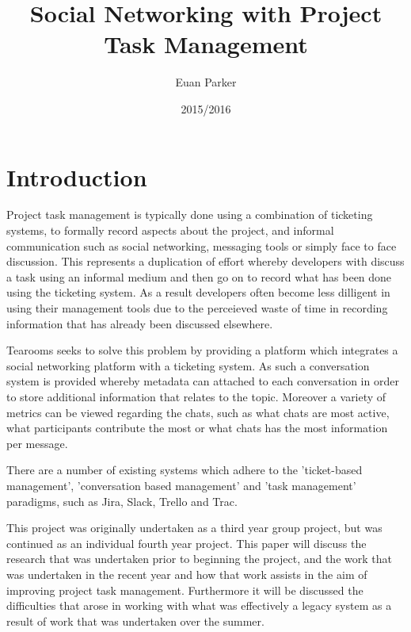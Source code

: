 \documentclass{l4proj}
\begin{document}
\title{Social Networking with Project Task Management}
\author{Euan Parker}
\date{2015/2016}
\maketitle

\begin{abstract}

\end{abstract}

\educationalconsent
%
%
\tableofcontents

\chapter{Introduction}


Project task management is typically done using a combination of ticketing systems, to formally record aspects about the project, and informal communication such as social networking, messaging tools or simply face to face discussion. This represents a duplication of effort whereby developers with discuss a task using an informal medium and then go on to record what has been done using the ticketing system.  As a result developers often become less dilligent in using their management tools due to the perceieved waste of time in recording information that has already been discussed elsewhere. 

Tearooms seeks to solve this problem by providing a platform which integrates a social networking platform with a ticketing system.  As such a conversation system is provided whereby metadata can attached to each conversation in order to store additional information that relates to the topic.  Moreover a variety of metrics can be viewed regarding the chats, such as what chats are most active, what participants contribute the most or what chats has the most information per message.

There are a number of existing systems which adhere to the 'ticket-based management', 'conversation based management' and 'task management' paradigms, such as Jira, Slack, Trello and Trac.

This project was originally undertaken as a third year group project, but was continued as an individual fourth year project.  This paper will discuss the research that was undertaken prior to beginning the project, and the work that was undertaken in the recent year and how that work assists in the aim of improving project task management.  Furthermore it will be discussed the difficulties that arose in working with what was effectively a legacy system as a result of work that was undertaken over the summer.
\end{document}
